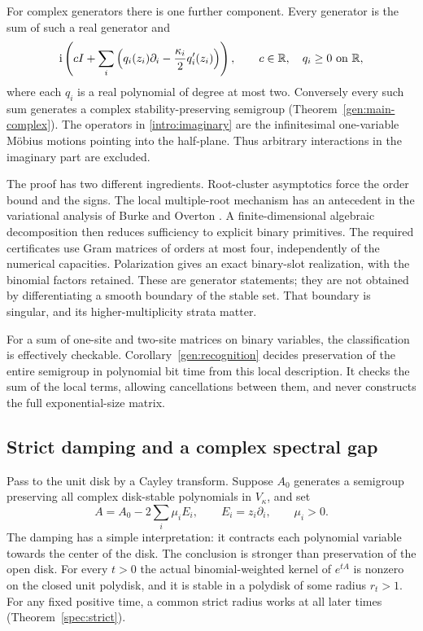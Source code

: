 \documentclass[reqno]{amsart}
\theoremstyle{definition}
\theoremstyle{remark}
\newcommand{\R}{\mathbb R}
\begin{document}
For complex generators there is one further component.
Every generator is the sum of such a real generator and
\begin{equation}\label{intro:imaginary}
 \mathrm i\left(cI+\sum_i
   \left(q_i(z_i)\partial_i-\frac{\kappa_i}{2}q_i'(z_i)\right)\right),
 \qquad c\in\R,\quad q_i\geq0\ \hbox{on }\R,
\end{equation}
where each $q_i$ is a real polynomial of degree at most two.
Conversely every such sum generates a complex stability-preserving
semigroup (Theorem~\ref{gen:main-complex}).
The operators in \eqref{intro:imaginary} are the infinitesimal
one-variable M\"obius motions pointing into the half-plane.
Thus arbitrary interactions in the imaginary part are excluded.

The proof has two different ingredients. Root-cluster asymptotics force
the order bound and the signs. The local multiple-root mechanism has
an antecedent in the variational analysis of Burke and Overton
\cite[Theorem~1.2 and Lemma~1.4]{BurkeOverton01}.
A finite-dimensional algebraic
decomposition then reduces sufficiency to explicit binary primitives.
The required certificates use Gram matrices of orders at most four,
independently of the numerical capacities. Polarization gives an exact
binary-slot realization, with the binomial factors retained.
These are generator statements; they are not obtained by differentiating
a smooth boundary of the stable set. That boundary is singular, and its
higher-multiplicity strata matter.

For a sum of one-site and two-site matrices on binary variables, the
classification is effectively checkable. Corollary~\ref{gen:recognition}
decides preservation of the entire semigroup in polynomial bit time
from this local description. It checks the sum of the local terms,
allowing cancellations between them, and never constructs the full
exponential-size matrix.

\subsection{Strict damping and a complex spectral gap}

Pass to the unit disk by a Cayley transform. Suppose $A_0$ generates
a semigroup preserving all complex disk-stable polynomials in
$V_\kappa$, and set
\begin{equation}\label{intro:damping}
 A=A_0-2\sum_i\mu_iE_i,\qquad E_i=z_i\partial_i,\qquad \mu_i>0.
\end{equation}
The damping has a simple interpretation: it contracts each polynomial
variable towards the center of the disk. The conclusion is stronger
than preservation of the open disk. For every $t>0$ the actual
binomial-weighted kernel of $e^{tA}$ is nonzero on the closed unit
polydisk, and it is stable in a polydisk of some radius $r_t>1$.
For any fixed positive time, a common strict radius works at all later
times (Theorem~\ref{spec:strict}).
\end{document}

